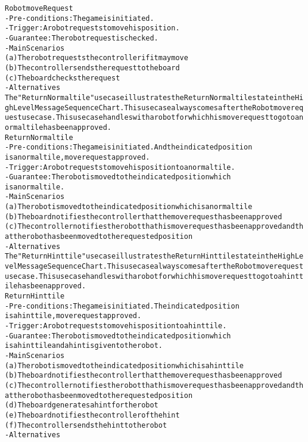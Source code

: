 \begin{alltt}
Robot move Request
- Pre-conditions: The game is initiated.
- Trigger: A robot requests to move his position.
- Guarantee: The robot request is checked.
- Main Scenarios
    (a) The robot requests the controller if it may move
    (b) The controller sends the request to the board
    (c) The board checks the request
- Alternatives \\

The "Return Normal tile" use case illustrates the Return Normal tile state in the High Level Message Sequence Chart. This use case always comes after the Robot move request use case. This use case handles with a robot for which his move request to go to a normal tile has been approved. \\

Return Normal tile
- Pre-conditions: The game is initiated. And the indicated position
    is a normal tile, move request approved.
- Trigger: A robot requests to move his position to a normal tile.
- Guarantee: The robot is moved to the indicated position which
    is a normal tile.
- Main Scenarios
    (a) The robot is moved to the indicated position which is a normal tile
    (b) The board notifies the controller that the move request has been approved
    (c) The controller notifies the robot that his move request has been approved and that the robot has been moved to the requested position
- Alternatives \\

The "Return Hint tile" use case illustrates the Return Hint tile state in the High Level Message Sequence Chart. This use case always comes after the Robot move request use case. This use case handles with a robot for which his move request to go to a hint tile has been approved. \\

Return Hint tile
- Pre-conditions: The game is initiated. The indicated position
    is a hint tile, move request approved.
- Trigger: A robot requests to move his position to a hint tile.
- Guarantee: The robot is moved to the indicated position which
    is a hint tile and a hint is given to the robot.
- Main Scenarios
    (a) The robot is moved to the indicated position which is a hint tile
    (b) The board notifies the controller that the move request has been approved
    (c) The controller notifies the robot that his move request has been approved and that the robot has been moved to the requested position
    (d) The board generates a hint for the robot
    (e) The board notifies the controller of the hint
    (f) The controller sends the hint to the robot
- Alternatives \\


\end{alltt}
